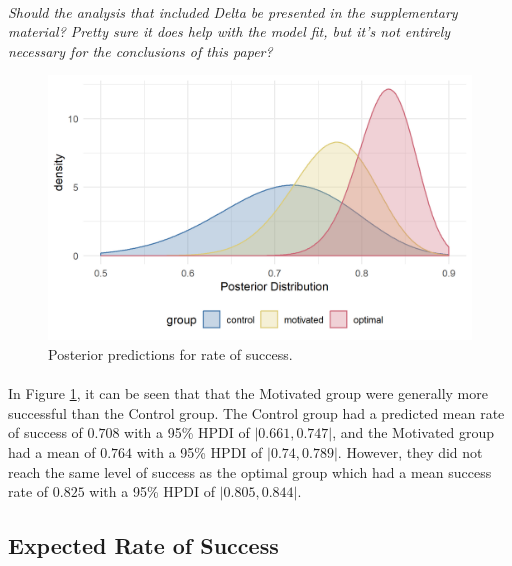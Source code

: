 \documentclass[12pt]{article}
\begin{document}
\paragraph{} \textit{Should the analysis that included Delta be presented in the supplementary material? Pretty sure it does help with the model fit, but it's not entirely necessary for the conclusions of this paper?}

\begin{figure}[ht!]
	\includegraphics[scale=1]{../Figures/Model_stan_rawacc.png}
	\centering
	\captionsetup{justification=centering}
	\caption{Posterior predictions for rate of success.}
	\label{fig:Model_raw_acc}
\end{figure}

\paragraph{} In Figure \ref{fig:Model_raw_acc}, it can be seen that that the Motivated group were generally more successful than the Control group. The Control group had a predicted mean rate of success of $0.708$ with a 95\% HPDI of $|0.661, 0.747|$, and the Motivated group had a mean of $0.764$ with a 95\% HPDI of $|0.74, 0.789|$. However, they did not reach the same level of success as the optimal group which had a mean success rate of $0.825$ with a 95\% HPDI of $|0.805, 0.844|$. 


\subsection*{Expected Rate of Success}
\end{document}
